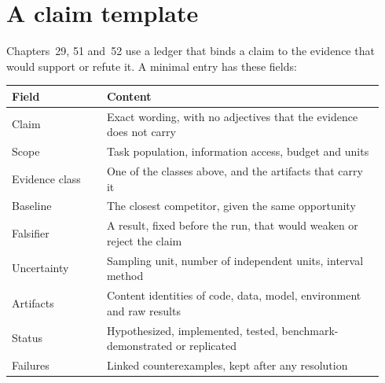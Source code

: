 \section{A claim template}
Chapters~29, 51 and~52 use a ledger that binds a claim to the evidence that would
support or refute it. A minimal entry has these fields:
\begin{center}\small
\begin{tabular}{@{}P{0.24\linewidth}P{0.70\linewidth}@{}}
\toprule
Field & Content\\\midrule
Claim & Exact wording, with no adjectives that the evidence does not carry\\
Scope & Task population, information access, budget and units\\
Evidence class & One of the classes above, and the artifacts that carry it\\
Baseline & The closest competitor, given the same opportunity\\
Falsifier & A result, fixed before the run, that would weaken or reject the claim\\
Uncertainty & Sampling unit, number of independent units, interval method\\
Artifacts & Content identities of code, data, model, environment and raw results\\
Status & Hypothesized, implemented, tested, benchmark-demonstrated or replicated\\
Failures & Linked counterexamples, kept after any resolution\\
\bottomrule
\end{tabular}
\end{center}

